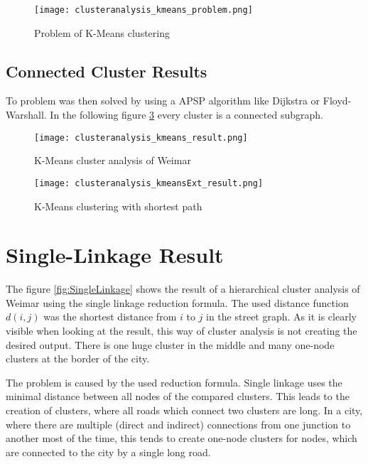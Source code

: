 \begin{figure}[!ht]
    \centering
    \begin{mdframed}[style=mdthight, userdefinedwidth=0.55\textwidth, align=center]
        \texttt{[image: clusteranalysis\_kmeans\_problem.png]}
    \end{mdframed}
    \caption{Problem of K-Means clustering
        \label{fig:KmeansProblem}}
\end{figure}

\subsection{Connected Cluster Results} \label{sec:K-Means_shortest_path}
To problem was then solved by using a \gls{APSP} algorithm like Dijkstra or Floyd-Warshall. In the following figure \ref{fig:Kmeansshortestp} every cluster is a connected subgraph.

\begin{figure}
    \centering
    \begin{mdframed}[style=mdthight]
        \texttt{[image: clusteranalysis\_kmeans\_result.png]}
    \end{mdframed}
    \caption{K-Means cluster analysis of Weimar \label{fig:KmeansGenerated}}
\end{figure}

\begin{figure}
    \centering
    \begin{mdframed}[style=mdthight]
        \texttt{[image: clusteranalysis\_kmeansExt\_result.png]}
    \end{mdframed}
    \caption{K-Means clustering with shortest path\label{fig:Kmeansshortestp}}
\end{figure}

\section{Single-Linkage Result}
The figure \ref{fig:SingleLinkage} shows the result of a hierarchical cluster analysis of Weimar using the single linkage reduction formula. The used distance function $d(i, j)$ was the shortest distance from $i$ to $j$ in the street graph. As it is clearly visible when looking at the result, this way of cluster analysis is not creating the desired output. There is one huge cluster in the middle and many one-node clusters at the border of the city.

The problem is caused by the used reduction formula. Single linkage uses the minimal distance between all nodes of the compared clusters. This leads to the creation of clusters, where all roads which connect two clusters are long. In a city, where there are multiple (direct and indirect) connections from one junction to another most of the time, this tends to create one-node clusters for nodes, which are connected to the city by a single long road.

